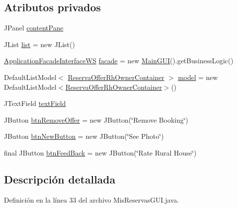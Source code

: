 \subsection*{Atributos privados}
\begin{DoxyCompactItemize}
\item 
J\+Panel \mbox{\hyperlink{classgui_1_1_mis_reservas_g_u_i_a0e75257d07910111e880685dd6453a9e}{content\+Pane}}
\item 
J\+List \mbox{\hyperlink{classgui_1_1_mis_reservas_g_u_i_a57d28f9e9e4ecff5c08b348934a72bc6}{list}} = new J\+List()
\item 
\mbox{\hyperlink{interfacebusiness_logic_1_1_application_facade_interface_w_s}{Application\+Facade\+Interface\+WS}} \mbox{\hyperlink{classgui_1_1_mis_reservas_g_u_i_a29c70d8f7ee208b3f955023be16bbfec}{facade}} = new \mbox{\hyperlink{classgui_1_1_main_g_u_i}{Main\+G\+UI}}().get\+Business\+Logic()
\item 
Default\+List\+Model$<$ \mbox{\hyperlink{classdomain_1_1_reserva_offer_rh_owner_container}{Reserva\+Offer\+Rh\+Owner\+Container}} $>$ \mbox{\hyperlink{classgui_1_1_mis_reservas_g_u_i_a7d1ff262cc15c57867d6613100ad54fe}{model}} = new Default\+List\+Model$<$\mbox{\hyperlink{classdomain_1_1_reserva_offer_rh_owner_container}{Reserva\+Offer\+Rh\+Owner\+Container}}$>$()
\item 
J\+Text\+Field \mbox{\hyperlink{classgui_1_1_mis_reservas_g_u_i_a8901fbadd3ea86c48507ead16452fba5}{text\+Field}}
\item 
J\+Button \mbox{\hyperlink{classgui_1_1_mis_reservas_g_u_i_a99d808ceec76346293264ea1a539c3aa}{btn\+Remove\+Offer}} = new J\+Button(\char`\"{}Remove Booking\char`\"{})
\item 
J\+Button \mbox{\hyperlink{classgui_1_1_mis_reservas_g_u_i_a2333042f2b3811fec9fd968b8fd033ba}{btn\+New\+Button}} = new J\+Button(\char`\"{}See Photo\char`\"{})
\item 
final J\+Button \mbox{\hyperlink{classgui_1_1_mis_reservas_g_u_i_a3a80cd8bcb066f875ff9e71e462924b8}{btn\+Feed\+Back}} = new J\+Button(\char`\"{}Rate Rural House\char`\"{})
\end{DoxyCompactItemize}


\subsection{Descripción detallada}


Definición en la línea 33 del archivo Mis\+Reservas\+G\+U\+I.\+java.



